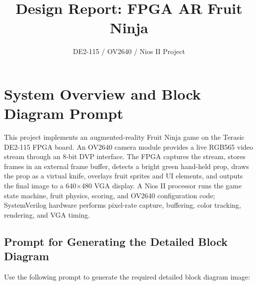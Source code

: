 \documentclass[10pt]{article}
\title{\vspace{-1.5em}Design Report: FPGA AR Fruit Ninja}
\author{DE2-115 / OV2640 / Nios II Project}
\date{}
\begin{document}
\maketitle
\vspace{-1.4em}

\section{System Overview and Block Diagram Prompt}

This project implements an augmented-reality Fruit Ninja game on the Terasic DE2-115 FPGA board. An OV2640 camera module provides a live RGB565 video stream through an 8-bit DVP interface. The FPGA captures the stream, stores frames in an external frame buffer, detects a bright green hand-held prop, draws the prop as a virtual knife, overlays fruit sprites and UI elements, and outputs the final image to a 640$\times$480 VGA display. A Nios II processor runs the game state machine, fruit physics, scoring, and OV2640 configuration code; SystemVerilog hardware performs pixel-rate capture, buffering, color tracking, rendering, and VGA timing.

\subsection{Prompt for Generating the Detailed Block Diagram}

Use the following prompt to generate the required detailed block diagram image:
\end{document}
